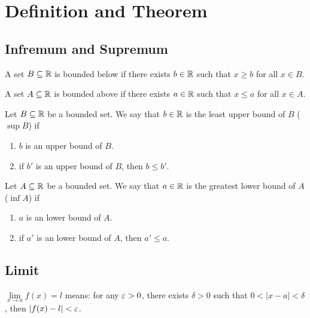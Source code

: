 \chapter{Definition and Theorem}

\section{Infremum and Supremum}

\begin{definition*}
  A set $B \subseteq \mathbb R$ is bounded below if there exists $b \in \mathbb R$ such that $ x \ge b$ for all $x \in B$. 
\end{definition*}

\begin{definition*}
  A set $A \subseteq \mathbb R$ is bounded above if there exists $a \in \mathbb R$ such that $ x \le a$ for all $x \in A$. 
\end{definition*}

\begin{definition*}
  Let $B \subseteq \mathbb R$ be a bounded set. We say that $b \in \mathbb R$ is the least upper bound of $B$ ($\sup B$) if
  \begin{enumerate}
    \item $b$ is an upper bound of $B$.
    \item if $b'$ is an upper bound of $B$, then $b \le b'$.
  \end{enumerate}
\end{definition*}

\begin{definition*}
  Let $A \subseteq \mathbb R$ be a bounded set. We say that $a \in \mathbb R$ is the greatest lower bound of $A$ ($\inf A$) if
  \begin{enumerate}
    \item $a$ is an lower bound of $A$.
    \item if $a'$ is an lower bound of $A$, then $a' \le a$.
  \end{enumerate}
\end{definition*}

\section{Limit}

\begin{definition*}
  $\lim\limits_{x\to a} f(x) = l$ means: for any $\varepsilon > 0$, there exists $\delta > 0$ such that $0 < |x-a| < \delta$, then $|f(x)-l| < \varepsilon$.
\end{definition*}

